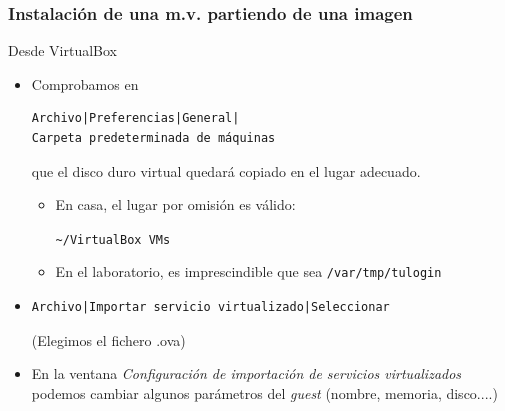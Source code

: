 \documentclass[ucs]{beamer}
\begin{document}
\begin{frame}[fragile]
\frametitle{Instalación de una m.v. partiendo de una imagen}
Desde VirtualBox

\begin{itemize}
\item
Comprobamos en 
\begin{scriptsize}
\begin{verbatim}
Archivo|Preferencias|General|
Carpeta predeterminada de máquinas
\end{verbatim}
\end{scriptsize}
que el disco duro virtual quedará copiado en el lugar adecuado.

\begin{itemize}
\item
En casa, el lugar por omisión es válido:

\verb|~/VirtualBox VMs|
\item
En el laboratorio, es imprescindible que sea \verb|/var/tmp/tulogin|
\end{itemize}


\item

  \begin{footnotesize}
  \begin{verbatim}
Archivo|Importar servicio virtualizado|Seleccionar
  \end{verbatim}
  \end{footnotesize}
(Elegimos el fichero .ova)
\item
En la ventana \emph{Configuración de importación de servicios virtualizados}
podemos cambiar algunos parámetros del \emph{guest} (nombre, memoria, disco....)
\end{itemize}

\end{frame}
\end{document}
